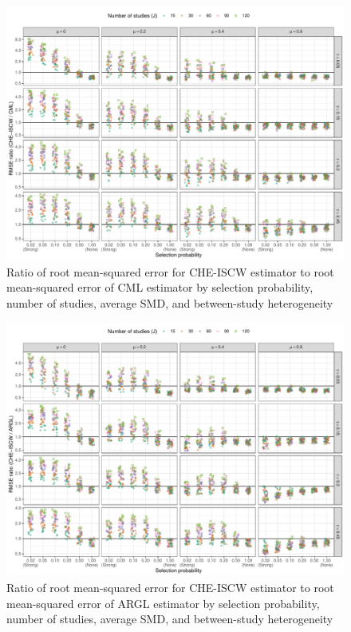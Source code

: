 \documentclass[
  man, donotrepeattitle,floatsintext]{apa7}
\begin{document}
\begin{figure}
\includegraphics{selection_models_draft_files/figure-latex/rmse-CHE-CML-1} \caption{Ratio of root mean-squared error for CHE-ISCW estimator to root mean-squared error of CML estimator by selection probability, number of studies, average SMD, and between-study heterogeneity}\label{fig:rmse-CHE-CML}
\end{figure}

\begin{figure}
\includegraphics{selection_models_draft_files/figure-latex/rmse-CHE-ARGL-1} \caption{Ratio of root mean-squared error for CHE-ISCW estimator to root mean-squared error of ARGL estimator by selection probability, number of studies, average SMD, and between-study heterogeneity}\label{fig:rmse-CHE-ARGL}
\end{figure}
\end{document}
